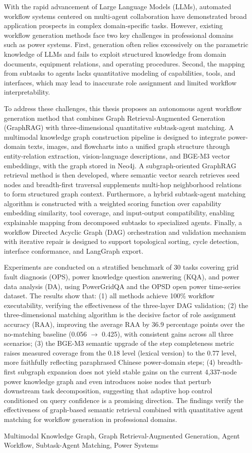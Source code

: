 \abstracten

With the rapid advancement of Large Language Models (LLMs), automated workflow systems centered on multi-agent collaboration have demonstrated broad application prospects in complex domain-specific tasks. However, existing workflow generation methods face two key challenges in professional domains such as power systems. First, generation often relies excessively on the parametric knowledge of LLMs and fails to exploit structured knowledge from domain documents, equipment relations, and operating procedures. Second, the mapping from subtasks to agents lacks quantitative modeling of capabilities, tools, and interfaces, which may lead to inaccurate role assignment and limited workflow interpretability.

To address these challenges, this thesis proposes an autonomous agent workflow generation method that combines Graph Retrieval-Augmented Generation (GraphRAG) with three-dimensional quantitative subtask-agent matching. A multimodal knowledge graph construction pipeline is designed to integrate power-domain texts, images, and flowcharts into a unified graph structure through entity-relation extraction, vision-language descriptions, and BGE-M3 vector embeddings, with the graph stored in Neo4j. A subgraph-oriented GraphRAG retrieval method is then developed, where semantic vector search retrieves seed nodes and breadth-first traversal supplements multi-hop neighborhood relations to form structured graph context. Furthermore, a hybrid subtask-agent matching algorithm is constructed with a weighted scoring function over capability embedding similarity, tool coverage, and input-output compatibility, enabling explainable mapping from decomposed subtasks to specialized agents. Finally, a workflow Directed Acyclic Graph (DAG) orchestration and validation mechanism with iterative repair is designed to support topological sorting, cycle detection, interface conformance, and LangGraph export.

Experiments are conducted on a stratified benchmark of 30 tasks covering grid fault diagnosis (OPS), power knowledge question answering (KQA), and power data analysis (DA), using PowerGridQA and the OPSD open power time-series dataset. The results show that: (1) all methods achieve 100\% workflow executability, verifying the effectiveness of the three-layer DAG validation; (2) the three-dimensional matching algorithm is the decisive factor of role assignment accuracy (RAA), improving the average RAA by 36.9 percentage points over the no-matching baseline (0.056 $\rightarrow$ 0.425), with consistent gains across all three scenarios; (3) the BGE-M3 semantic upgrade of the step completeness metric raises measured coverage from the 0.18 level (lexical version) to the 0.77 level, more faithfully reflecting paraphrased Chinese power-domain steps; (4) breadth-first subgraph expansion does not yield stable gains on the current 4{,}337-node power knowledge graph and even introduces noise nodes that perturb downstream task decomposition, suggesting that adaptive hop control conditioned on query confidence is a promising direction. The findings verify the effectiveness of graph-based semantic retrieval combined with quantitative agent matching for workflow generation in professional domains.

\vspace{5pt}

\keywordsen Multimodal Knowledge Graph, Graph Retrieval-Augmented Generation, Agent Workflow, Subtask-Agent Matching, Power Systems
